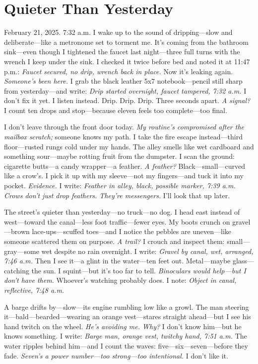 \documentclass{article}
\begin{document}
\section*{Quieter Than Yesterday}

February 21, 2025. 7:32 a.m. I wake up to the sound of dripping—slow and deliberate—like a metronome set to torment me. It’s coming from the bathroom sink—even though I tightened the faucet last night—three full turns with the wrench I keep under the sink. I checked it twice before bed and noted it at 11:47 p.m.: \textit{Faucet secured, no drip, wrench back in place.} Now it’s leaking again. \textit{Someone’s been here.} I grab the black leather 5x7 notebook—pencil still sharp from yesterday—and write: \textit{Drip started overnight, faucet tampered, 7:32 a.m.} I don’t fix it yet. I listen instead. Drip. Drip. Drip. Three seconds apart. \textit{A signal?} I count ten drops and stop—because eleven feels too complete—too final.

I don’t leave through the front door today. \textit{My routine’s compromised after the mailbox scratch;} someone knows my path. I take the fire escape instead—third floor—rusted rungs cold under my hands. The alley smells like wet cardboard and something sour—maybe rotting fruit from the dumpster. I scan the ground: cigarette butts—a candy wrapper—a feather. \textit{A feather?} Black—small—curved like a crow’s. I pick it up with my sleeve—not my fingers—and tuck it into my pocket. \textit{Evidence.} I write: \textit{Feather in alley, black, possible marker, 7:39 a.m.} \textit{Crows don’t just drop feathers. They’re messengers.} I’ll look that up later.

The street’s quieter than yesterday—no truck—no dog. I head east instead of west—toward the canal—less foot traffic—fewer eyes. My boots crunch on gravel—brown lace-ups—scuffed toes—and I notice the pebbles are uneven—like someone scattered them on purpose. \textit{A trail?} I crouch and inspect them: small—gray—some wet despite no rain overnight. I write: \textit{Gravel by canal, wet, arranged, 7:46 a.m.} Then I see it—a glint in the water—ten feet out. Metal—maybe glass—catching the sun. I squint—but it’s too far to tell. \textit{Binoculars would help—but I don’t have them.} Whoever’s watching probably does. I note: \textit{Object in canal, reflective, 7:48 a.m.}

A barge drifts by—slow—its engine rumbling low like a growl. The man steering it—bald—bearded—wearing an orange vest—stares straight ahead—but I see his hand twitch on the wheel. \textit{He’s avoiding me. Why?} I don’t know him—but he knows something. I write: \textit{Barge man, orange vest, twitchy hand, 7:51 a.m.} The water ripples behind him—and I count the waves: five—six—seven—before they fade. \textit{Seven’s a power number—too strong—too intentional.} I don’t like it.
\end{document}
